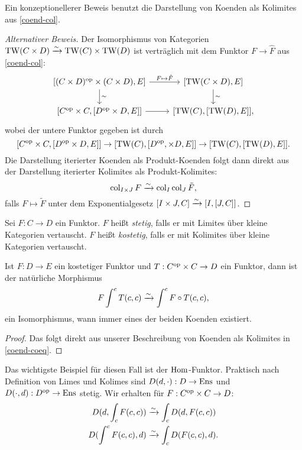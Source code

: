  Ein konzeptionellerer Beweis benutzt die Darstellung von Koenden als
 Kolimites aus \ref{coend-col}.
\begin{proof}[Alternativer Beweis]
  Der Isomorphismus von Kategorien $\operatorname{TW}(C \times D) \xrightarrow[]{\sim} \operatorname{TW}(C) \times
  \operatorname{TW}(D)$ ist verträglich mit dem Funktor $F \to \hat{F}$ aus
  \ref{coend-col}:
  \[ \begin{tikzcd}
    {[(C \times D)\op \times (C \times D), E]}
    \arrow{d}{\sim} \arrow{r}{F \mapsto \hat{F}}
    & {[\TW(C \times D), E]} \arrow{d}{\sim} \\
    {[C\op \times C, [D\op \times D, E]]} \arrow{r}
    & {[\TW(C), [\TW(D), E]]},
  \end{tikzcd}
  \]
  wobei der untere Funktor gegeben ist durch
  \[ [C^\mathrm{op} \times C, [D^\mathrm{op} \times D, E]]
  \to [\operatorname{TW}(C), [D^\mathrm{op}, \times D, E]] \to [\operatorname{TW}(C), [\operatorname{TW}(D), E]].
  \]
  Die Darstellung iterierter Koenden als Produkt-Koenden folgt dann
  direkt aus der Darstellung iterierter Kolimites als
  Produkt-Kolimites:
  \[ \operatorname{col}_{I \times J} F \xrightarrow[]{\sim} \operatorname{col}_I \operatorname{col}_J \tilde{F}, \]
  falls $F \mapsto \tilde{F}$ unter dem Exponentialgesetz $[I \times
    J, C] \xrightarrow[]{\sim} {[I, [J, C]]}$.
\end{proof}

\begin{defn}
  Sei $F: C \to D$ ein Funktor. $F$ heißt \emph{stetig}, falls er mit
  Limites über kleine Kategorien vertauscht. $F$ heißt
  \emph{kostetig}, falls er mit Kolimites über kleine Kategorien
  vertauscht.
\end{defn}
\begin{lemma}
  \label{coend-cocont}
  Ist $F: D \to E$ ein kostetiger Funktor und $T: C^\mathrm{op} \times C \to D$
  ein Funktor, dann ist der natürliche Morphismus
  \[ F \int^c T(c, c) \xrightarrow[]{\sim} \int^c F \circ T(c, c), \]
  ein Isomorphismus, wann immer eines der beiden Koenden existiert.
\end{lemma}
\begin{proof}
  Das folgt direkt aus unserer Beschreibung von Koenden als Kolimites
  in \ref{coend-coeq}.
\end{proof}
\begin{bem}
  Das wichtigste Beispiel für diesen Fall ist der
  $\operatorname{Hom}$-Funktor. Praktisch nach Definition von Limes und Kolimes sind
  $D(d, \cdot): D \to \operatorname{Ens}$ und $D(\cdot, d): D^\mathrm{op} \to \operatorname{Ens}$
  stetig. Wir erhalten für $F: C^\mathrm{op} \times C \to D$:
  \begin{align*}
    D(d, \int_c F(c, c)) & \xrightarrow[]{\sim} \int_c D(d, F(c, c)) \\
    D(\int^c F(c, c), d) &\xrightarrow[]{\sim} \int_c D(F(c, c), d).
  \end{align*}
\end{bem}

